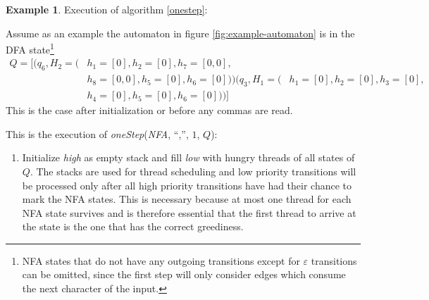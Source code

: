 \documentclass[english]{sigplanconf}
\theoremstyle{definition}
\newtheorem{example}{Example}[section]
\begin{document}
\begin{example} Execution of algorithm \ref{onestep}:
\label{ex:oneStep1}

Assume as an example the automaton in figure \ref{fig:example-automaton} is in the DFA state\footnote{NFA states that do not have any outgoing transitions except for $\varepsilon$ transitions can be omitted, since the first step will only consider edges which consume the next character of the input.} 
\begin{align*}
Q=[
	(q_6, H_2=(&h_1=[0], h_2=[0], h_7=[0,0], \\
	&h_8=[0,0], h_5=[0], h_6=[0]))
	(q_3, H_1=(&h_1=[0], h_2=[0], h_3=[0], \\
	&h_4=[0], h_5=[0], h_6=[0]))]
	\end{align*}
This is the case after initialization or before any commas are read.

This is the execution of \emph{oneStep}(\emph{NFA}, ``,'', $1$, $Q$):

\begin{enumerate}
\item Initialize \emph{high} as empty stack and fill \emph{low} with hungry threads of all states of $Q$. The stacks are used for
thread scheduling and low priority transitions will be processed only after all 
high priority transitions have had their chance to mark the NFA states.
This is necessary because at most one thread for each NFA state survives 
and is therefore essential that the first thread to arrive at the 
state is the one that has the correct greediness.


\end{enumerate}
\end{example}
\end{document}
